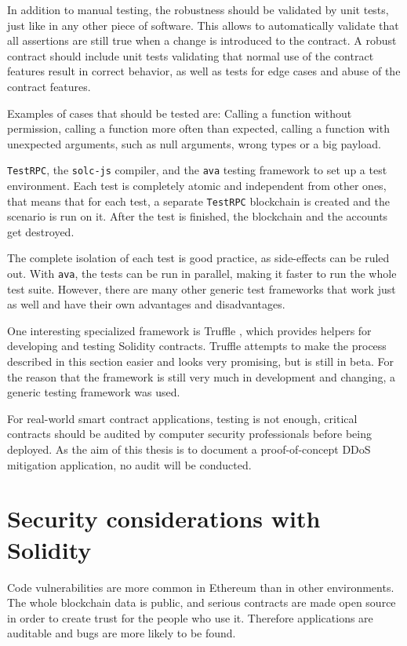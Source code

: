In addition to manual testing, the robustness should be validated by unit tests, just like in any other piece of software. This allows to automatically validate that all assertions are still true when a change is introduced to the contract. A robust contract should include unit tests validating that normal use of the contract features result in correct behavior, as well as tests for edge cases and abuse of the contract features.

Examples of cases that should be tested are: Calling a function without permission, calling a function more often than expected, calling a function with unexpected arguments, such as null arguments, wrong types or a big payload.

\texttt{TestRPC}, the \texttt{solc-js} compiler, and the \texttt{ava} testing framework to set up a test environment. Each test is completely atomic and independent from other ones, that means that for each test, a separate \texttt{TestRPC} blockchain is created and the scenario is run on it. After the test is finished, the blockchain and the accounts get destroyed.

The complete isolation of each test is good practice, as side-effects can be ruled out. With \texttt{ava}, the tests can be run in parallel, making it faster to run the whole test suite. However, there are many other generic test frameworks that work just as well and have their own advantages and disadvantages.

One interesting specialized framework is Truffle \cite{Truffle}, which provides helpers for developing and testing Solidity contracts. Truffle attempts to make the process described in this section easier and looks very promising, but is still in beta. For the reason that the framework is still very much in development and changing, a generic testing framework was used.

For real-world smart contract applications, testing is not enough, critical contracts should be audited by computer security professionals before being deployed. As the aim of this thesis is to document a proof-of-concept DDoS mitigation application, no audit will be conducted.

\section{Security considerations with Solidity}
Code vulnerabilities are more common in Ethereum than in other environments. The whole blockchain data is public, and serious contracts are made open source in order to create trust for the people who use it. Therefore applications are auditable and bugs are more likely to be found.

